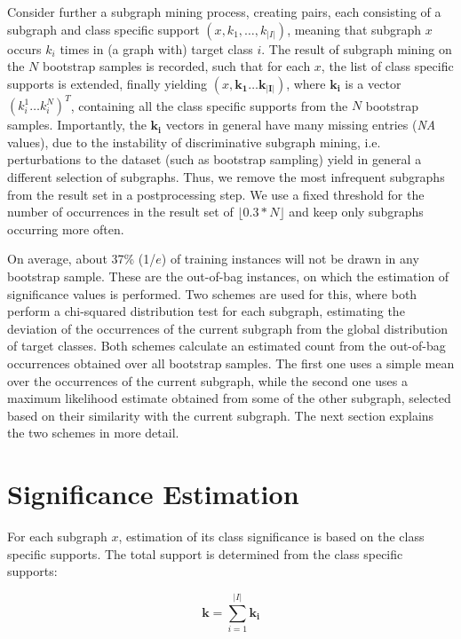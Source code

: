 \documentclass{article}
\begin{document}
Consider further a subgraph mining process, creating pairs, each consisting of
a subgraph and class specific support $(x,k_1,\ldots,k_{\vert I\vert})$,
meaning that subgraph $x$ occurs $k_i$ times in (a graph with) target class
$i$.  The result of subgraph mining on the $N$ bootstrap samples is recorded,
such that for each $x$, the list of class specific supports is extended, finally
yielding $(x,\mathbf{k_1}\ldots\mathbf{k_{\vert I\vert}})$, where $\mathbf{k_i}$
is a vector $(k_i^1\ldots k_i^N)^T$, containing all the class specific supports
from the $N$ bootstrap samples.
Importantly, the $\mathbf{k_i}$ vectors in general have many missing entries
(\emph{NA} values), due to the instability of discriminative subgraph mining, i.e.
perturbations to the dataset (such as bootstrap sampling) yield in general a
different selection of subgraphs. Thus, we remove the most infrequent subgraphs
from the result set in a postprocessing step. We use a fixed threshold for the number of occurrences in the result set of $\lfloor0.3*N\rfloor$ and keep only subgraphs occurring more often.

On average, about 37\% (1/$e$) of training instances will not be drawn in any
bootstrap sample. These are the out-of-bag instances, on which the estimation
of significance values is performed. Two schemes are used for this, where both
perform a chi-squared distribution test for each subgraph, estimating the
deviation of the occurrences of the current subgraph from the global
distribution of target classes. Both schemes calculate an estimated count from
the out-of-bag occurrences obtained over all bootstrap samples. The first one
uses a simple mean over the occurrences of the current subgraph, while the
second one uses a maximum likelihood estimate obtained from some of the other
subgraph, selected based on their similarity with the current subgraph. The next
section explains the two schemes in more detail.

\section{Significance Estimation}
\label{s:significance-estimation}

For each subgraph $x$, estimation of its class significance is based on the class specific supports. 
The total support is determined from the class specific supports:

\begin{equation}
  \mathbf{k}=\sum_{i=1}^{\vert I\vert} \mathbf{k_i}
  \label{eqn:total-support}
\end{equation}
\end{document}
